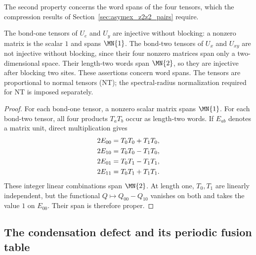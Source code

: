 The second property concerns the word spans of the four tensors,
which the compression results of
Section~\ref{sec:asymex_z2z2_pairs} require.

\begin{lemma}%
    \label{thm:asymex_z2z2_normal}
    \leanok
    The bond-one tensors of $U_e$ and $U_y$ are injective without
    blocking: a nonzero matrix is the scalar $1$ and spans
    $\MN{1}$. The bond-two tensors of $U_x$ and $U_{xy}$ are not
    injective without blocking, since their four nonzero matrices span
    only a two-dimensional space. Their length-two words span
    $\MN{2}$, so they are injective after blocking two sites.
    These assertions concern word spans. The tensors are proportional
    to normal tensors (NT); the spectral-radius normalization required
    for NT is imposed separately.
\end{lemma}

\begin{proof}
    \leanok
    For each bond-one tensor, a nonzero scalar matrix spans $\MN{1}$.
    For each bond-two tensor, all four products $T_aT_b$ occur as
    length-two words. If $E_{ab}$ denotes a matrix unit, direct
    multiplication gives
    \begin{align}
        2E_{00} & =T_0T_0+T_1T_0, \notag \\
        2E_{10} & =T_0T_0-T_1T_0, \notag \\
        2E_{01} & =T_0T_1-T_1T_1, \notag \\
        2E_{11} & =T_0T_1+T_1T_1.
        \notag
    \end{align}
    These integer linear combinations span $\MN{2}$.
    At length one, $T_0,T_1$ are linearly independent, but the
    functional $Q\mapsto Q_{00}-Q_{10}$ vanishes on both and takes
    the value $1$ on $E_{00}$. Their span is therefore proper.
\end{proof}

\subsection{The condensation defect and its periodic fusion table}%
\label{sec:asymex_z2z2_defect}

